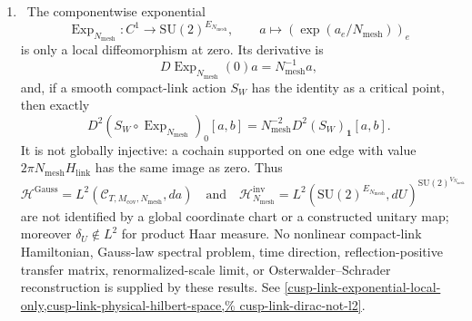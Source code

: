\begin{enumerate}[leftmargin=1.8em]
\item \Verified\ The componentwise exponential
\[
 \operatorname{Exp}_{N_{\mathrm{mesh}}}:C^1
 \longrightarrow\mathrm{SU}(2)^{E_{N_{\mathrm{mesh}}}},
 \qquad a\longmapsto(\exp(a_e/N_{\mathrm{mesh}}))_e
\]
is only a local diffeomorphism at zero.  Its derivative is
\[
 D\operatorname{Exp}_{N_{\mathrm{mesh}}}(0)a
 =N_{\mathrm{mesh}}^{-1}a,
\]
and, if a smooth compact-link action \(S_W\) has the identity as a critical
point, then exactly
\[
 D^2(S_W\circ\operatorname{Exp}_{N_{\mathrm{mesh}}})_0[a,b]
 =N_{\mathrm{mesh}}^{-2}D^2(S_W)_{\mathbf1}[a,b].
\]
It is not globally injective: a cochain supported on one edge with value
\(2\pi N_{\mathrm{mesh}}H_{\mathrm{link}}\) has the same image as zero.  Thus
\[
 \mathcal H^{\mathrm{Gauss}}
 =L^2(\mathscr C_{T,M_{\mathrm{cov}},N_{\mathrm{mesh}}},da)
 \quad\text{and}\quad
 \mathcal H^{\mathrm{inv}}_{N_{\mathrm{mesh}}}
 =L^2(\mathrm{SU}(2)^{E_{N_{\mathrm{mesh}}}},dU)^{
   \mathrm{SU}(2)^{V_{N_{\mathrm{mesh}}}}}
\]
are not identified by a global coordinate chart or a constructed unitary
map; moreover \(\delta_U\notin L^2\) for product Haar measure.  No nonlinear
compact-link Hamiltonian, Gauss-law spectral problem, time direction,
reflection-positive transfer matrix, renormalized-scale limit, or
Osterwalder--Schrader reconstruction is supplied by these results.  See
\cref{cusp-link-exponential-local-only,cusp-link-physical-hilbert-space,%
cusp-link-dirac-not-l2}.


\end{enumerate}

